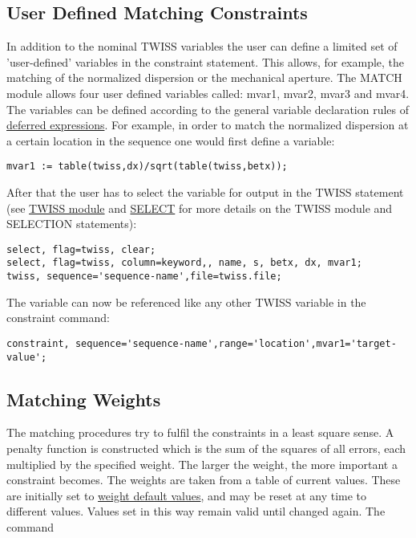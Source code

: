 \subsection{User Defined Matching Constraints}
\label{subsec:match_con_user}

In addition to the nominal TWISS variables the user can define a limited
set of 'user-defined' variables in the constraint statement. This
allows, for example, the matching of the normalized dispersion or the
mechanical aperture. The MATCH module allows four user defined variables
called: mvar1, mvar2, mvar3 and mvar4. 
The variables can be defined according to the general variable
declaration rules of  
\href{../Introduction/expression.html#defer}{deferred expressions}.
For example, in order to match the normalized dispersion at a certain
location in the sequence one would first define a variable:

\begin{verbatim}
mvar1 := table(twiss,dx)/sqrt(table(twiss,betx));
\end{verbatim}

After that the user has to select the variable for output in the TWISS
statement (see \href{../twiss/twiss.html}{TWISS module} and
\href{../Introduction/select.html}{SELECT} for more
details on the TWISS module and SELECTION statements):
\begin{verbatim}
select, flag=twiss, clear;
select, flag=twiss, column=keyword,, name, s, betx, dx, mvar1;
twiss, sequence='sequence-name',file=twiss.file;
\end{verbatim}

The variable can now be referenced like any other TWISS variable
in the constraint command:
\begin{verbatim}
constraint, sequence='sequence-name',range='location',mvar1='target-value';
\end{verbatim}

\subsection{Matching Weights}
\label{subsec:match_con_weight}

The matching procedures try to fulfil the constraints
in a least square sense.
A penalty function is constructed which is the sum of the
squares of all errors,
each multiplied by the specified weight.
The larger the weight, the more important a constraint becomes.
The weights are taken from a table of current values.
These are initially set to \hyperlink{default}{weight default values},
and may be reset at any time to different values.
Values set in this way remain valid until changed again.
The command

